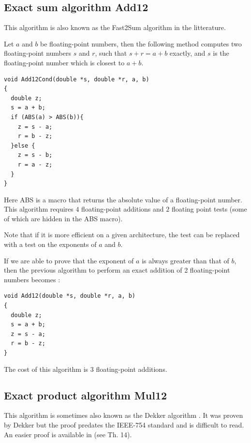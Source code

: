 \subsection{Exact sum algorithm {Add12}}

This algorithm is also known as the Fast2Sum algorithm in the
litterature.
\begin{theorem}
  Let $a$ and $b$ be floating-point numbers, then the following method
  computes two floating-point numbers $s$ and $r$, such that $s+r =
  a+b$ exactly, and $s$ is the floating-point number which is closest
  to $a+b$.

\begin{lstlisting}[label={lst:Add12Cond},caption={Add12Cond},firstnumber=1]
void Add12Cond(double *s, double *r, a, b) 
{
  double z;
  s = a + b;            
  if (ABS(a) > ABS(b)){  
    z = s - a;           
    r = b - z;           
  }else {                 
    z = s - b;           
    r = a - z;           
  } 
}                         
\end{lstlisting}
Here ABS is a macro that returns the absolute value of a
floating-point number. This algorithm requires $4$ floating-point additions and $2$ floating
point tests (some of which are hidden in the ABS macro). 

Note that if it is more efficient on a given architecture, the test can be replaced
with a test on the exponents of $a$ and $b$.

\end{theorem}


If we are able to prove that  the exponent of $a$ is always greater than that
of $b$, then the previous algorithm to perform an exact addition of 2
floating-point numbers becomes :
\begin{lstlisting}[label={lst:Add12},caption={Add12},firstnumber=1]
void Add12(double *s, double *r, a, b) 
{
  double z;
  s = a + b;            
  z = s - a;  
  r = b - z; 
}            
\end{lstlisting}
The cost of this algorithm is $3$ floating-point additions.






\subsection{Exact product algorithm {Mul12}}

This algorithm is sometimes also known as the Dekker algorithm
\cite{Dek71}. It was proven by Dekker but the proof predates the
IEEE-754 standard and is difficult to read. An easier proof is
available in \cite{Gol91} (see Th. 14).

